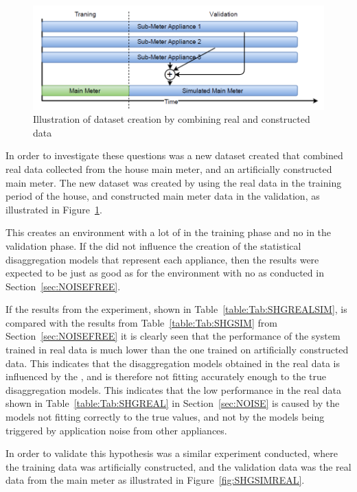 \begin{figure}[H]
\centering
\includegraphics[width=1\textwidth]{billeder/REALSIM.png}
\caption{Illustration of dataset creation by combining real and constructed data}
\label{fig:REALSIMILU}
\end{figure}

In order to investigate these questions was a new dataset created that combined real data collected from the house main meter, and an artificially constructed main meter. The new dataset was created by using the real data in the training period of the house, and constructed main meter data in the validation, as illustrated in Figure~\ref{fig:REALSIMILU}.

This creates an environment with a lot of  in the training phase and no  in the validation phase. If the  did not influence the creation of the statistical disaggregation models that represent each appliance, then the results were expected to be just as good as for the environment with no  as conducted in Section~\ref{sec:NOISEFREE}.




If the results from the experiment, shown in Table~\ref{table:Tab:SHGREALSIM}, is compared with the results from Table~\ref{table:Tab:SHGSIM} from Section~\ref{sec:NOISEFREE} it is clearly seen that the performance of the system trained in real data is much lower than the one trained on artificially constructed data. This indicates that the disaggregation models obtained in the real data is influenced by the , and is therefore not fitting accurately enough to the true disaggregation models. This indicates that the low performance in the real data shown in Table~\ref{table:Tab:SHGREAL} in Section~\ref{sec:NOISE} is caused by the models not fitting correctly to the true values, and not by the models being triggered by application noise from other appliances.

In order to validate this hypothesis was a similar experiment conducted, where the training data was artificially constructed, and the validation data was the real data from the main meter as illustrated in Figure~\ref{fig:SHGSIMREAL}. 

